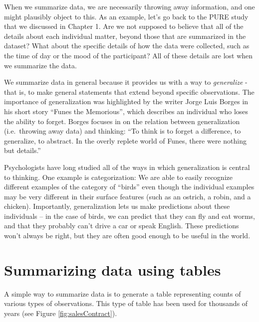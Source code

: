 \documentclass[12pt,]{book}
\theoremstyle{definition}
\theoremstyle{definition}
\theoremstyle{definition}
\theoremstyle{remark}
\begin{document}
When we summarize data, we are necessarily throwing away information, and one might plausibly object to this. As an example, let's go back to the PURE study that we discussed in Chapter 1. Are we not supposed to believe that all of the details about each individual matter, beyond those that are summarized in the dataset? What about the specific details of how the data were collected, such as the time of day or the mood of the participant? All of these details are lost when we summarize the data.

We summarize data in general because it provides us with a way to \emph{generalize} - that is, to make general statements that extend beyond specific observations. The importance of generalization was highlighted by the writer Jorge Luis Borges in his short story ``Funes the Memorious'', which describes an individual who loses the ability to forget. Borges focuses in on the relation between generalization (i.e.~throwing away data) and thinking: ``To think is to forget a difference, to generalize, to abstract. In the overly replete world of Funes, there were nothing but details.''

Psychologists have long studied all of the ways in which generalization is central to thinking. One example is categorization: We are able to easily recognize different examples of the category of ``birds'' even though the individual examples may be very different in their surface features (such as an ostrich, a robin, and a chicken). Importantly, generalization lets us make predictions about these individuals -- in the case of birds, we can predict that they can fly and eat worms, and that they probably can't drive a car or speak English. These predictions won't always be right, but they are often good enough to be useful in the world.

\hypertarget{summarizing-data-using-tables}{%
\section{Summarizing data using tables}\label{summarizing-data-using-tables}}

A simple way to summarize data is to generate a table representing counts of various types of observations. This type of table has been used for thousands of years (see Figure \ref{fig:salesContract}).
\end{document}
